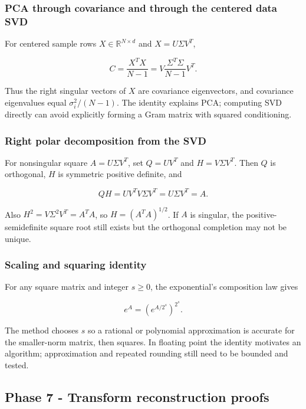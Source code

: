 \subsubsection{PCA through covariance and through the centered data SVD}\label{02-foundations-ii-ch039-pca-through-covariance-and-through-the-centered-data-svd}

For centered sample rows \(X\in\mathbb R^{N\times d}\) and \(X=U\Sigma V^T\),

\[
C=\frac{X^TX}{N-1}
=V\frac{\Sigma^T\Sigma}{N-1}V^T.
\]

Thus the right singular vectors of \(X\) are covariance eigenvectors, and covariance eigenvalues equal \(\sigma_i^2/(N-1)\). The identity explains PCA; computing SVD directly can avoid explicitly forming a Gram matrix with squared conditioning.

\subsubsection{Right polar decomposition from the SVD}\label{02-foundations-ii-ch039-right-polar-decomposition-from-the-svd}

For nonsingular square \(A=U\Sigma V^T\), set \(Q=UV^T\) and \(H=V\Sigma V^T\). Then \(Q\) is orthogonal, \(H\) is symmetric positive definite, and

\[
QH=UV^TV\Sigma V^T=U\Sigma V^T=A.
\]

Also \(H^2=V\Sigma^2V^T=A^TA\), so \(H=(A^TA)^{1/2}\). If \(A\) is singular, the positive-semidefinite square root still exists but the orthogonal completion may not be unique.

\subsubsection{Scaling and squaring identity}\label{02-foundations-ii-ch039-scaling-and-squaring-identity}

For any square matrix and integer \(s\ge0\), the exponential's composition law gives

\[
e^A=\left(e^{A/2^s}\right)^{2^s}.
\]

The method chooses \(s\) so a rational or polynomial approximation is accurate for the smaller-norm matrix, then squares. In floating point the identity motivates an algorithm; approximation and repeated rounding still need to be bounded and tested.

\subsection{Phase 7 - Transform reconstruction proofs}\label{02-foundations-ii-ch039-phase-7---transform-reconstruction-proofs}

